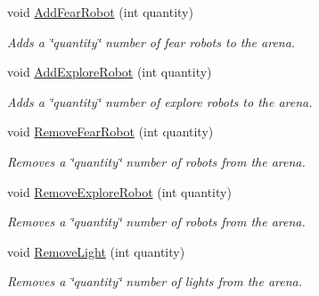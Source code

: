 \begin{DoxyCompactItemize}
\mbox{\label{class_arena_a096bfda0e247cf61c3adeddcf85e525c}} 
void \mbox{\hyperlink{class_arena_a096bfda0e247cf61c3adeddcf85e525c}{Add\+Fear\+Robot}} (int quantity)
\begin{DoxyCompactList}\small\item\em Adds a \char`\"{}quantity\char`\"{} number of fear robots to the arena. \end{DoxyCompactList}\item 
\mbox{\label{class_arena_a437042b7bec3bf0d0142b576f27c0d80}} 
void \mbox{\hyperlink{class_arena_a437042b7bec3bf0d0142b576f27c0d80}{Add\+Explore\+Robot}} (int quantity)
\begin{DoxyCompactList}\small\item\em Adds a \char`\"{}quantity\char`\"{} number of explore robots to the arena. \end{DoxyCompactList}\item 
\mbox{\label{class_arena_ab369fb4240dd226c2aa1226f261d76d8}} 
void \mbox{\hyperlink{class_arena_ab369fb4240dd226c2aa1226f261d76d8}{Remove\+Fear\+Robot}} (int quantity)
\begin{DoxyCompactList}\small\item\em Removes a \char`\"{}quantity\char`\"{} number of robots from the arena. \end{DoxyCompactList}\item 
\mbox{\label{class_arena_acbda840f62b571747d2cdc2e981dbcf8}} 
void \mbox{\hyperlink{class_arena_acbda840f62b571747d2cdc2e981dbcf8}{Remove\+Explore\+Robot}} (int quantity)
\begin{DoxyCompactList}\small\item\em Removes a \char`\"{}quantity\char`\"{} number of robots from the arena. \end{DoxyCompactList}\item 
\mbox{\label{class_arena_aab318a21d3edcf5e3a5f2b3d569f9df4}} 
void \mbox{\hyperlink{class_arena_aab318a21d3edcf5e3a5f2b3d569f9df4}{Remove\+Light}} (int quantity)
\begin{DoxyCompactList}\small\item\em Removes a \char`\"{}quantity\char`\"{} number of lights from the arena. \end{DoxyCompactList}\item 

\end{DoxyCompactItemize}
